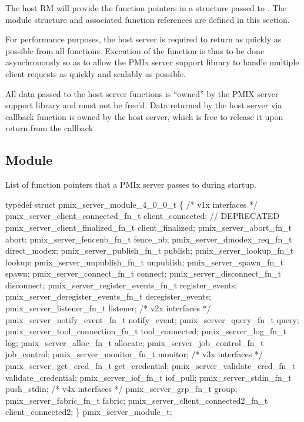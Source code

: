 The host \ac{RM} will provide the function pointers in a  structure passed to .
The module structure and associated function references are defined in this section.

\advicermstart
For performance purposes, the host server is required to return as quickly as possible from all functions. Execution of
the function is thus to be done asynchronously so as to allow the \ac{PMIx} server support library to handle multiple client requests
as quickly and scalably as possible.

All data passed to the host server functions is ``owned'' by the
PMIX server support library and must not be free'd. Data returned
by the host server via callback function is owned by the host
server, which is free to release it upon return from the callback
\advicermend

\subsection{ Module}
\label{server:module_fns}
\summary

List of function pointers that a PMIx server passes to  during startup.

\format

\cspecificstart
\begin{codepar}
typedef struct pmix_server_module_4_0_0_t \{
    /* v1x interfaces */
    pmix_server_client_connected_fn_t   client_connected;  // DEPRECATED
    pmix_server_client_finalized_fn_t   client_finalized;
    pmix_server_abort_fn_t              abort;
    pmix_server_fencenb_fn_t            fence_nb;
    pmix_server_dmodex_req_fn_t         direct_modex;
    pmix_server_publish_fn_t            publish;
    pmix_server_lookup_fn_t             lookup;
    pmix_server_unpublish_fn_t          unpublish;
    pmix_server_spawn_fn_t              spawn;
    pmix_server_connect_fn_t            connect;
    pmix_server_disconnect_fn_t         disconnect;
    pmix_server_register_events_fn_t    register_events;
    pmix_server_deregister_events_fn_t  deregister_events;
    pmix_server_listener_fn_t           listener;
    /* v2x interfaces */
    pmix_server_notify_event_fn_t       notify_event;
    pmix_server_query_fn_t              query;
    pmix_server_tool_connection_fn_t    tool_connected;
    pmix_server_log_fn_t                log;
    pmix_server_alloc_fn_t              allocate;
    pmix_server_job_control_fn_t        job_control;
    pmix_server_monitor_fn_t            monitor;
    /* v3x interfaces */
    pmix_server_get_cred_fn_t           get_credential;
    pmix_server_validate_cred_fn_t      validate_credential;
    pmix_server_iof_fn_t                iof_pull;
    pmix_server_stdin_fn_t              push_stdin;
    /* v4x interfaces */
    pmix_server_grp_fn_t                group;
    pmix_server_fabric_fn_t             fabric;
    pmix_server_client_connected2_fn_t  client_connected2;
\} pmix_server_module_t;
\end{codepar}
\cspecificend

